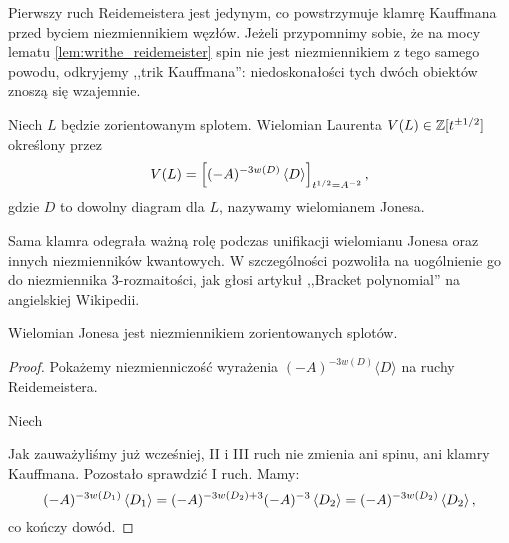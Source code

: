 Pierwszy ruch Reidemeistera jest jedynym, co powstrzymuje klamrę Kauffmana przed byciem niezmiennikiem węzłów.
Jeżeli przypomnimy sobie, że na mocy lematu \ref{lem:writhe_reidemeister} spin nie jest niezmiennikiem z tego samego powodu, odkryjemy ,,trik Kauffmana'': niedoskonałości tych dwóch obiektów znoszą się wzajemnie.
%
%

\begin{definition}
\label{def:jones_polynomial}%
    Niech $L$ będzie zorientowanym splotem.
    Wielomian Laurenta $V(L) \in \mathbb Z[t^{\pm 1/2}]$ określony przez
    \begin{equation}
        V(L)=\left[(-A)^{-3w(D)} \left\langle{D}\right\rangle\right]_{t^{1/2}=A^{-2}},
    \end{equation}
    gdzie $D$ to dowolny diagram dla $L$, nazywamy wielomianem Jonesa.
\end{definition}

Sama klamra odegrała ważną rolę podczas unifikacji wielomianu Jonesa oraz innych niezmienników kwantowych.
W szczególności pozwoliła na uogólnienie go do niezmiennika 3-rozmaitości, jak głosi artykuł ,,Bracket polynomial'' na angielskiej Wikipedii.

\begin{proposition}
    Wielomian Jonesa jest niezmiennikiem zorientowanych splotów.
\end{proposition}

\begin{proof}
    Pokażemy niezmienniczość wyrażenia $(-A)^{-3w(D)}\langle D\rangle$ na ruchy Reidemeistera.

    Niech
\begin{comment}
    \begin{equation}
        D_1 := \LargeReidemeisterOneLeft,
        \quad\quad\quad
        D_2 := \LargeReidemeisterOneStraight.
    \end{equation}
\end{comment}
    Jak zauważyliśmy już wcześniej, II i III ruch nie zmienia ani spinu, ani klamry Kauffmana.
    Pozostało sprawdzić I ruch.
    Mamy:
    \begin{equation}
        (-A)^{-3 w\left(D_1\right)} \left\langle{D_1}\right\rangle =
        (-A)^{-3 w\left(D_2\right) + 3} (-A)^{-3}\left\langle{D_2}\right\rangle =
        (-A)^{-3 w\left(D_2\right)} \left\langle{D_2}\right\rangle,
    \end{equation}
    co kończy dowód.
\end{proof}

